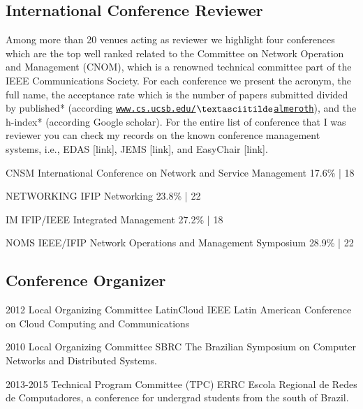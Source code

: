 \documentclass[]{friggeri-cv} %
\begin{document}
\subsection{International Conference Reviewer}
Among more than 20 venues acting as reviewer we highlight four conferences which are the top well ranked related to the Committee on Network Operation and Management (CNOM), which is a renowned technical committee part of the IEEE Communications Society. For each conference we present the acronym, the full name, the acceptance rate which is the number of papers submitted divided by published* (according \href{http://www.cs.ucsb .edu/~almeroth/conf/stats}{\texttt{www.cs.ucsb.edu/$\textasciitilde$almeroth}}), and the h-index* (according Google scholar). For the entire list of conference that I was reviewer you can check my records on the known conference management systems, i.e., EDAS [link], JEMS [link], and EasyChair [link].

\begin{entrylist}

\vspace{-0.3cm}
\entry
{CNSM} %
{International Conference on Network and Service Management}
{17.6\% | 18}

\vspace{-0.3cm}
\entry
{NETWORKING} %
{IFIP Networking}
{23.8\% | 22 }

\vspace{-0.3cm}
\entry
{IM} %
{IFIP/IEEE Integrated Management}
{27.2\% | 18}

\vspace{-0.3cm}
\entry
{NOMS} %
{IEEE/IFIP Network Operations and Management Symposium }
{28.9\% | 22}


\end{entrylist}

\let\thefootnote\relax{}

\subsection{Conference Organizer}

\begin{entrylist}

\entry
{2012} 
{Local Organizing Committee}
{LatinCloud}
{IEEE Latin American Conference on Cloud Computing and Communications}

\entry
{2010}
{Local Organizing Committee}
{SBRC}
{The Brazilian Symposium on Computer Networks and Distributed Systems.}

\entry
{2013-2015} 
{Technical Program Committee (TPC)}
{ERRC}
{Escola Regional de Redes de Computadores, a conference for undergrad students from the south of Brazil.}


\end{entrylist}
\end{document}

